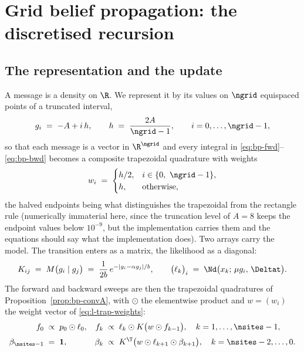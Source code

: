 \section{Grid belief propagation: the discretised recursion}
\label{sec:l-grid}

\subsection{The representation and the update}

A message is a density on $\R$. We represent it by its values on $\ngrid$
equispaced points of a truncated interval,
\begin{equation}
  g_i \;=\; -A + i\,h, \qquad h \;=\; \frac{2A}{\ngrid - 1},
  \qquad i = 0, \dots, \ngrid-1,
  \label{eq:l-grid}
\end{equation}
so that each message is a vector in $\R^{\ngrid}$ and every integral in
\eqref{eq:bp-fwd}--\eqref{eq:bp-bwd} becomes a composite trapezoidal
quadrature with weights
\begin{equation}
  w_i \;=\;
  \begin{cases}
    h/2, & i \in \{0,\ \ngrid-1\},\\
    h,   & \text{otherwise},
  \end{cases}
  \label{eq:l-trap-weights}
\end{equation}
the halved endpoints being what distinguishes the trapezoidal from the
rectangle rule (numerically immaterial here, since the truncation level of
$A = 8$ keeps the endpoint values below $10^{-9}$, but the implementation
carries them and the equations should say what the implementation does). Two arrays carry the
model. The transition enters as a matrix, the likelihood as a diagonal:
\begin{equation}
  K_{ij} \;=\; M\big(g_i \mid g_j\big)
        \;=\; \frac{1}{2b}\, e^{-|g_i - \alpha g_j| / b},
  \qquad
  \big(\ell_k\big)_i
        \;=\; \Nd\big(x_k;\, \mu g_i,\, \Deltat\big).
  \label{eq:l-grid-operators}
\end{equation}
The forward and backward sweeps are then the trapezoidal quadratures of
Proposition~\ref{prop:bp-convA}, with $\odot$ the elementwise product and
$w = (w_i)$ the weight vector of \eqref{eq:l-trap-weights}:
\begin{align}
  f_0 &\;\propto\; p_0 \odot \ell_0,
  &f_k &\;\propto\; \ell_k \odot K\big( w \odot f_{k-1} \big),
  \quad k = 1,\dots,\nsites-1,
  \label{eq:l-grid-fwd}\\[2pt]
  \beta_{\nsites-1} &\;=\; \mathbf{1},
  &\beta_k &\;\propto\; K^\T \big( w \odot \ell_{k+1} \odot \beta_{k+1} \big),
  \quad k = \nsites-2,\dots,0 .
  \label{eq:l-grid-bwd}
\end{align}
